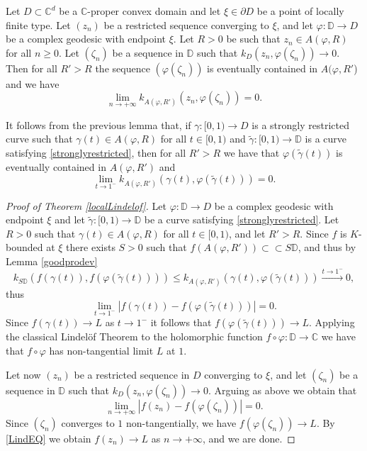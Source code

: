 \documentclass[10pt,a4paper]{amsart}
\newcommand{\C}{\mathbb{C}}
\newcommand{\D}{\mathbb{D}}
\begin{document}
		\begin{lemma}\label{goodprodev}
			Let $D\subset\C^d$ be a $\C$-proper convex domain and let $\xi\in\partial D$ be a point of locally finite type.
			Let $(z_n)$ be a restricted sequence converging to $\xi$, and let $\varphi\colon \D\to D$ be a complex geodesic with endpoint $\xi$. Let $R>0$ be such that  $z_n\in A(\varphi,R)$ for all $n\geq 0$.
			Let  $(\zeta_n)$ be a sequence in $\D$ such that 
			$k_D(z_n,\varphi(\zeta_n))\to 0.$ Then for all $R'>R$ the sequence $(\varphi(\zeta_n))$ is eventually contained in $A(\varphi,R'$) and we have
			$$\lim_{n\to+\infty}k_{A(\varphi,R')}(z_n,\varphi(\zeta_n))=0.$$
		\end{lemma}

		\begin{remark}It follows from the previous lemma that, if $\gamma\colon[0,1)\to D$ is a strongly restricted curve such that $\gamma(t)\in A(\varphi,R)$ for all $t\in[0,1)$ and $\tilde{\gamma}\colon[0,1)\to\D$  is a curve satisfying \eqref{stronglyrestricted}, then for all $R'>R$ we have that 
			$\varphi(\tilde\gamma(t))$ is eventually contained in $A(\varphi,R')$ and
			$$\lim_{t\to 1^-}k_{A(\varphi,R')}(\gamma(t),\varphi(\tilde\gamma(t)))=0.$$
		\end{remark}

		\begin{proof}[Proof of Theorem \ref{localLindelof}]
			Let  $\varphi\colon \D\to D$ be a complex geodesic with endpoint $\xi$ and 
			let $\tilde \gamma\colon[0,1)\to \D$ be a curve satisfying \eqref{stronglyrestricted}.
			Let $R>0$ such that $\gamma(t)\in A(\varphi,R)$ for all $t\in[0,1)$, and 	let $R'>R$. 
			Since $f$ is $K$-bounded at $\xi$ there exists $S>0$ such that $f(A(\varphi,R'))\subset\subset S\D$, and thus by Lemma \ref{goodprodev}
			$$k_{S\D}(f(\gamma(t)),f(\varphi(\tilde\gamma(t))))\leq k_{A(\varphi,R')}(\gamma(t),\varphi(\tilde \gamma(t)))\stackrel{t\to 1^-}\longrightarrow 0,$$ 
			thus
			$$
			\lim_{t\to1^-}|f(\gamma(t))-f(\varphi(\tilde \gamma(t)))|=0.
			$$
			Since $f(\gamma(t))\to L$ as $t\to 1^-$ it follows that $f(\varphi(\tilde \gamma(t)))\to L$. Applying the classical Lindel\"{o}f Theorem to the holomorphic function $f\circ\varphi\colon \D\to \C$ we have that $f\circ\varphi$ has non-tangential limit $L$ at $1$.
			
			
			
			Let now $(z_n)$ be a  restricted sequence in $D$ converging to $\xi$, and let  $(\zeta_n)$ be a sequence in $\D$ such that 
			$k_D(z_n,\varphi(\zeta_n))\to 0.$
			Arguing as above we obtain that 
			\begin{equation}\label{LindEQ}
				\lim_{n\to+\infty}|f(z_n)-f(\varphi(\zeta_n))|=0.
			\end{equation}
			Since  $(\zeta_n)$ converges to $1$ non-tangentially, we have  $f(\varphi(\zeta_n))\to L$. By \eqref{LindEQ} we obtain $f(z_n)\to L$ as $n\to+\infty$, and we are done.
		\end{proof}
\end{document}
